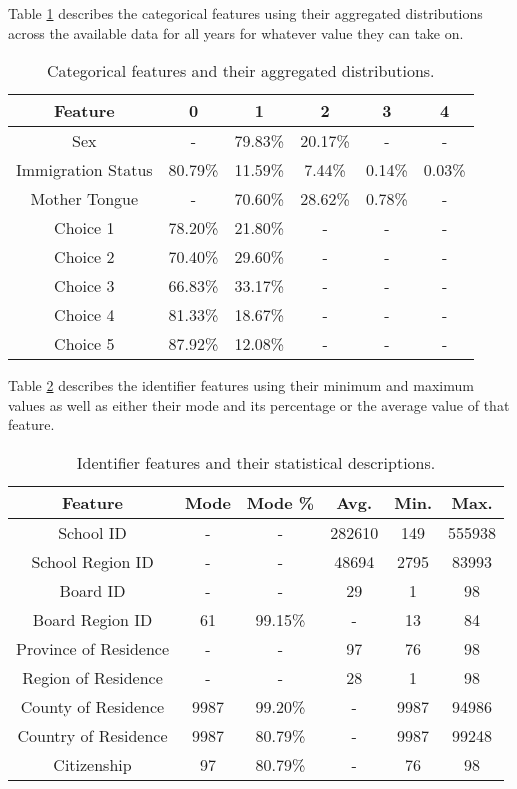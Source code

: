 Table \ref{tab:categoricalFeatures} describes the categorical features using their aggregated distributions across the available data for all years for whatever value they can take on.

\begin{table}[!hb]
\begin{center}
\begin{tabular}{c|c|c|c|c|c}
	\textbf{Feature}	&\textbf{0}	&\textbf{1}	&\textbf{2}	&\textbf{3}	&\textbf{4}\\\hline
	Sex					&-			&79.83\%	&20.17\%	&-			&-\\
	Immigration Status	&80.79\%	&11.59\%	&7.44\%		&0.14\%		&0.03\%\\
	Mother Tongue		&-			&70.60\%	&28.62\%	&0.78\%		&-\\
	Choice 1			&78.20\%	&21.80\%	&-			&-			&-\\
	Choice 2			&70.40\%	&29.60\%	&-			&-			&-\\
	Choice 3			&66.83\%	&33.17\%	&-			&-			&-\\
	Choice 4			&81.33\%	&18.67\%	&-			&-			&-\\
	Choice 5			&87.92\%	&12.08\%	&-			&-			&-
\end{tabular}
\end{center}
\caption{Categorical features and their aggregated distributions.}
\label{tab:categoricalFeatures}
\end{table}

Table \ref{tab:idFeatures} describes the identifier features using their minimum and maximum values as well as either their mode and its percentage or the average value of that feature.

\begin{table}[!ht]
\begin{center}
\begin{tabular}{c|c|c|c|c|c}
	\textbf{Feature}		&\textbf{Mode}	&\textbf{Mode \%}	&\textbf{Avg.}	&\textbf{Min.}	&\textbf{Max.}\\\hline
	School ID				&-				&-					&282610			&149			&555938\\
	School Region ID		&-				&-					&48694			&2795			&83993\\
	Board ID				&-				&-					&29				&1				&98\\
	Board Region ID			&61				&99.15\%			&-				&13				&84\\
	Province of Residence	&-				&-					&97				&76				&98\\
	Region of Residence		&-				&-					&28				&1				&98\\
	County of Residence		&9987			&99.20\%			&-				&9987			&94986\\
	Country of Residence	&9987			&80.79\%			&-				&9987			&99248\\
	Citizenship				&97				&80.79\%			&-				&76				&98
\end{tabular}
\end{center}
\caption{Identifier features and their statistical descriptions.}
\label{tab:idFeatures}
\end{table}

